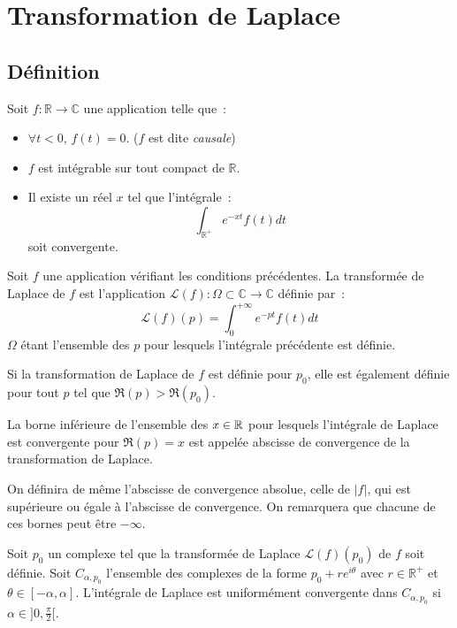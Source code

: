 \chapter{Transformation de Laplace}
\section{Définition}
Soit $f : \mathbb{R} \to \mathbb{C}$ une application telle que~:
\begin{itemize}
\item $\forall t < 0, \, f(t) = 0$. ($f$ est dite \textit{causale}) 
\item $f$ est intégrable sur tout compact de $\mathbb{R}$.
\item Il existe un réel $x$ tel que l'intégrale~:
\[
\int_{\mathbb{R}^+}e^{-xt} f(t) dt
\]
soit convergente.
\end{itemize}

\begin{fdefn}
Soit $f$ une application vérifiant les conditions précédentes. La
transformée de Laplace de $f$ est l'application $\mathcal{L}(f) : \Omega \subset \mathbb{C} \to
\mathbb{C}$ définie par~:
\[
\mathcal{L}(f)(p) = \int_0^{+\infty}e^{-pt} f(t) dt
\]
$\Omega$ étant l'ensemble des $p$ pour lesquels l'intégrale précédente
est définie.
\end{fdefn}

\begin{fprop}
Si la transformation de Laplace de $f$ est définie pour $p_0$, elle
est également définie pour tout $p$ tel que $\Re(p) > \Re(p_0)$.
\end{fprop} 

La borne inférieure de l'ensemble des $x \in \mathbb R$ pour lesquels l'intégrale de
Laplace est convergente pour $\Re(p) = x$ est appelée abscisse de
convergence de la transformation de Laplace. 

On définira de même l'abscisse de convergence absolue, celle de $\vert f \vert$, qui est
supérieure ou égale à l'abscisse de convergence. On remarquera que
chacune de ces bornes peut être $-\infty$.

\begin{fprop}
Soit $p_0$ un complexe tel que la transformée de Laplace $\mathcal{L}(f)(p_0)$ de
$f$ soit définie. Soit $C_{\alpha, p_0}$ l'ensemble des complexes de
la forme $p_0 + r e^{i \theta}$ avec $r \in \mathbb{R}^+$ et $\theta
\in [-\alpha, \alpha]$. L'intégrale de Laplace est uniformément
convergente dans $C_{\alpha, p_0}$ si $\alpha \in ]0, \frac{\pi}{2}[$.
\end{fprop}

